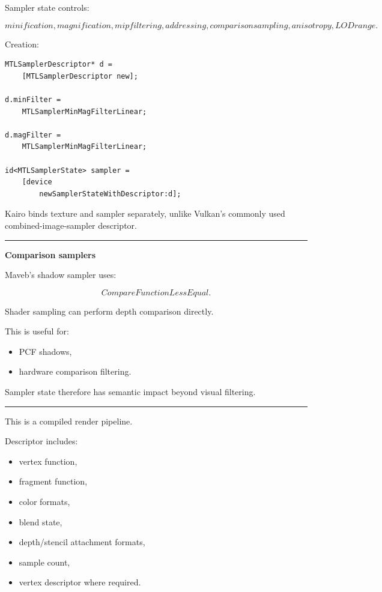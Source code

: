 Sampler state controls:

\[
minification,
magnification,
mip filtering,
addressing,
comparison sampling,
anisotropy,
LOD range.
\]

Creation:

\begin{verbatim}
MTLSamplerDescriptor* d =
    [MTLSamplerDescriptor new];

d.minFilter =
    MTLSamplerMinMagFilterLinear;

d.magFilter =
    MTLSamplerMinMagFilterLinear;

id<MTLSamplerState> sampler =
    [device
        newSamplerStateWithDescriptor:d];
\end{verbatim}

Kairo binds texture and sampler separately, unlike Vulkan's commonly used combined-image-sampler descriptor.

\begin{center}\rule{0.5\linewidth}{0.5pt}\end{center}

\textbf{Comparison samplers}

Maveb's shadow sampler uses:

\[
CompareFunctionLessEqual.
\]

Shader sampling can perform depth comparison directly.

This is useful for:

\begin{itemize}
\tightlist
\item
  PCF shadows,
\item
  hardware comparison filtering.
\end{itemize}

Sampler state therefore has semantic impact beyond visual filtering.

\begin{center}\rule{0.5\linewidth}{0.5pt}\end{center}

\textbf{}

This is a compiled render pipeline.

Descriptor includes:

\begin{itemize}
\tightlist
\item
  vertex function,
\item
  fragment function,
\item
  color formats,
\item
  blend state,
\item
  depth/stencil attachment formats,
\item
  sample count,
\item
  vertex descriptor where required.
\end{itemize}

